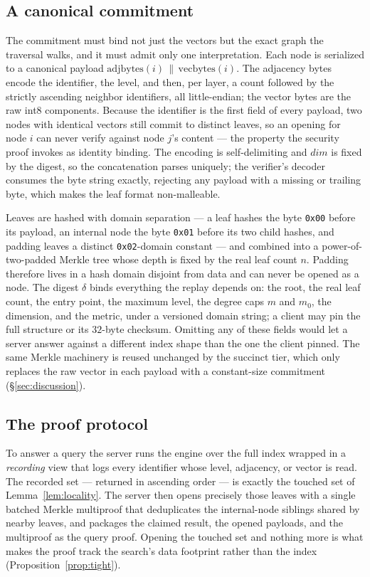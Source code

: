 \documentclass[11pt]{article}
\begin{document}
\subsection{A canonical commitment}

The commitment must bind not just the vectors but the exact graph the
traversal walks, and it must admit only one interpretation. Each node is
serialized to a canonical payload
$\mathrm{adjbytes}(i)\,\|\,\mathrm{vecbytes}(i)$. The adjacency bytes
encode the identifier, the level, and then, per layer, a count followed
by the strictly ascending neighbor identifiers, all little-endian; the
vector bytes are the raw int8 components. Because the identifier is the
first field of every payload, two nodes with identical vectors still
commit to distinct leaves, so an opening for node $i$ can never verify
against node $j$'s content --- the property the security proof invokes
as identity binding. The encoding is self-delimiting and $\mathit{dim}$
is fixed by the digest, so the concatenation parses uniquely; the
verifier's decoder consumes the byte string exactly, rejecting any
payload with a missing or trailing byte, which makes the leaf format
non-malleable.

Leaves are hashed with domain separation --- a leaf hashes the byte
\texttt{0x00} before its payload, an internal node the byte
\texttt{0x01} before its two child hashes, and padding leaves a distinct
\texttt{0x02}-domain constant --- and combined into a
power-of-two-padded Merkle tree whose depth is fixed by the real leaf
count $n$. Padding therefore lives in a hash domain disjoint from data
and can never be opened as a node. The digest $\delta$ binds everything
the replay depends on: the root, the real leaf count, the entry point,
the maximum level, the degree caps $m$ and $m_0$, the dimension, and the
metric, under a versioned domain string; a client may pin the full
structure or its $32$-byte checksum. Omitting any of these fields would
let a server answer against a different index shape than the one the
client pinned. The same Merkle machinery is reused unchanged by the
succinct tier, which only replaces the raw vector in each payload with a
constant-size commitment (\S\ref{sec:discussion}).

\subsection{The proof protocol}

To answer a query the server runs the engine over the full index wrapped
in a \emph{recording} view that logs every identifier whose level,
adjacency, or vector is read. The recorded set --- returned in ascending
order --- is exactly the touched set of Lemma~\ref{lem:locality}. The
server then opens precisely those leaves with a single batched Merkle
multiproof that deduplicates the internal-node siblings shared by nearby
leaves, and packages the claimed result, the opened payloads, and the
multiproof as the query proof. Opening the touched set and nothing more
is what makes the proof track the search's data footprint rather than
the index (Proposition~\ref{prop:tight}).
\end{document}
